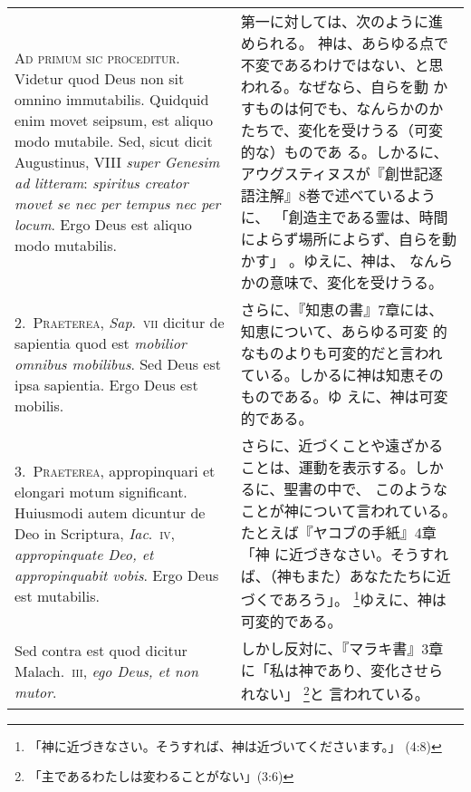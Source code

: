 \documentclass[10pt]{jsarticle} %
\begin{document}
\begin{longtable}{p{21em}p{21em}}
{\huge A}{\scshape d primum sic proceditur}. Videtur quod Deus non sit
omnino immutabilis.  Quidquid enim movet seipsum, est aliquo modo
mutabile. Sed, sicut dicit Augustinus, VIII {\it super Genesim ad
litteram}:  {\itshape spiritus creator movet se nec per tempus nec per
locum}. Ergo Deus est aliquo modo mutabilis.

& 

第一に対しては、次のように進められる。
神は、あらゆる点で不変であるわけではない、と思われる。なぜなら、自らを動
かすものは何でも、なんらかのかたちで、変化を受けうる（可変的な）ものであ
る。しかるに、アウグスティヌスが『創世記逐語注解』8巻で述べているように、
「創造主である霊は、時間によらず場所によらず、自らを動かす」 。ゆえに、神は、
なんらかの意味で、変化を受けうる。

\\

2.~{\scshape Praeterea}, {\it Sap}.~{\scshape vii} dicitur de sapientia quod est
{\itshape mobilior omnibus mobilibus}. Sed Deus est ipsa sapientia. Ergo
Deus est mobilis.  
&

さらに、『知恵の書』7章には、知恵について、あらゆる可変
的なものよりも可変的だと言われている。しかるに神は知恵そのものである。ゆ
えに、神は可変的である。

\\

3.~{\scshape Praeterea}, appropinquari et elongari motum
 significant. Huiusmodi autem dicuntur de Deo in Scriptura, {\it
 Iac}.~{\scshape iv}, {\itshape appropinquate Deo, et appropinquabit
 vobis}. Ergo Deus est mutabilis.

&

さらに、近づくことや遠ざかることは、運動を表示する。しかるに、聖書の中で、
 このようなことが神について言われている。たとえば『ヤコブの手紙』4章「神
 に近づきなさい。そうすれば、（神もまた）あなたたちに近づくであろう」。
 \footnote{「神に近づきなさい。そうすれば、神は近づいてくださいます。」
 (4:8)}ゆえに、神は可変的である。

\\

Sed contra est quod dicitur Malach.~{\scshape iii}, {\itshape ego Deus,
 et non mutor}.

&
しかし反対に、『マラキ書』3章に「私は神であり、変化させられない」
 \footnote{「主であるわたしは変わることがない」(3:6)}と
 言われている。


\\



\end{longtable}
\end{document}
